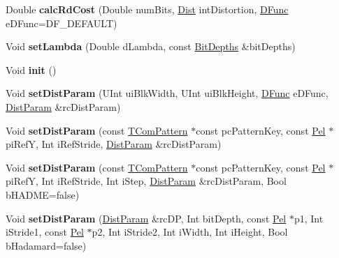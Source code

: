\begin{DoxyCompactItemize}
\item 
\mbox{\label{class_t_com_rd_cost_a07ef20f52c976f9154cd950c754ef23a}} 
Double {\bfseries calc\+Rd\+Cost} (Double num\+Bits, \hyperlink{_type_def_8h_a507835e5fb717ea5af4e8b075c8cbede}{Dist} int\+Distortion, \hyperlink{_type_def_8h_ac19dbe1a542fc0c0bc8a94fcc55907c8}{D\+Func} e\+D\+Func=D\+F\+\_\+\+D\+E\+F\+A\+U\+LT)
\item 
\mbox{\label{class_t_com_rd_cost_a574bc80780c426d63ae96b1b3c904d8f}} 
Void {\bfseries set\+Lambda} (Double d\+Lambda, const \hyperlink{struct_bit_depths}{Bit\+Depths} \&bit\+Depths)
\item 
\mbox{\label{class_t_com_rd_cost_a3281224638d4defac623c1ceee1ac68e}} 
Void {\bfseries init} ()
\item 
\mbox{\label{class_t_com_rd_cost_a308d676e9f6d66356e4446c746ae8d45}} 
Void {\bfseries set\+Dist\+Param} (U\+Int ui\+Blk\+Width, U\+Int ui\+Blk\+Height, \hyperlink{_type_def_8h_ac19dbe1a542fc0c0bc8a94fcc55907c8}{D\+Func} e\+D\+Func, \hyperlink{class_dist_param}{Dist\+Param} \&rc\+Dist\+Param)
\item 
\mbox{\label{class_t_com_rd_cost_a3615af5c9616c56924fd37338a76823b}} 
Void {\bfseries set\+Dist\+Param} (const \hyperlink{class_t_com_pattern}{T\+Com\+Pattern} $\ast$const pc\+Pattern\+Key, const \hyperlink{_type_def_8h_af92141699657699b4b547be0c8517541}{Pel} $\ast$pi\+RefY, Int i\+Ref\+Stride, \hyperlink{class_dist_param}{Dist\+Param} \&rc\+Dist\+Param)
\item 
\mbox{\label{class_t_com_rd_cost_a5947b47ae354cb6df97387ae39489834}} 
Void {\bfseries set\+Dist\+Param} (const \hyperlink{class_t_com_pattern}{T\+Com\+Pattern} $\ast$const pc\+Pattern\+Key, const \hyperlink{_type_def_8h_af92141699657699b4b547be0c8517541}{Pel} $\ast$pi\+RefY, Int i\+Ref\+Stride, Int i\+Step, \hyperlink{class_dist_param}{Dist\+Param} \&rc\+Dist\+Param, Bool b\+H\+A\+D\+ME=false)
\item 
\mbox{\label{class_t_com_rd_cost_ae98c04b497b4092d01272ef1b7edc2ca}} 
Void {\bfseries set\+Dist\+Param} (\hyperlink{class_dist_param}{Dist\+Param} \&rc\+DP, Int bit\+Depth, const \hyperlink{_type_def_8h_af92141699657699b4b547be0c8517541}{Pel} $\ast$p1, Int i\+Stride1, const \hyperlink{_type_def_8h_af92141699657699b4b547be0c8517541}{Pel} $\ast$p2, Int i\+Stride2, Int i\+Width, Int i\+Height, Bool b\+Hadamard=false)

\end{DoxyCompactItemize}
